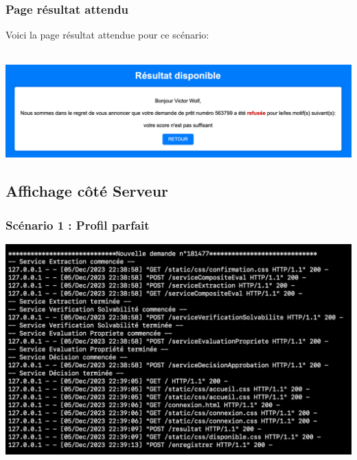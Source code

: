 \documentclass{article}
\begin{document}
        \subsubsection{Page résultat attendu}
        Voici la page résultat attendue pour ce scénario: \\
        \\
        \begin{center}
            \includegraphics[width=400pt]{Images/12.3/resultat3.png}\\
        \end{center}

\newpage

    \subsection{Affichage côté Serveur}
    \subsubsection{Scénario 1 : Profil parfait}
    \includegraphics[width=400pt]{Images/12.4/serveur1.png}
\end{document}
